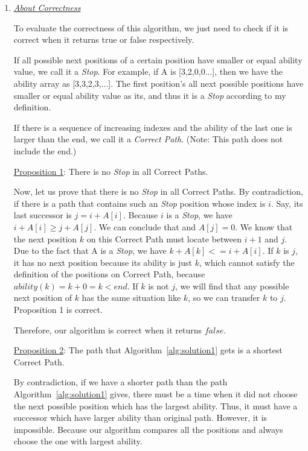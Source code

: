\documentclass[12pt,a4paper]{article}
\makeatletter
\newtheorem*{solution}{Solution}
\renewenvironment{solution}[1][Solution] {\par\pushQED{\qed}\normalfont\topsep6\p@\@plus6\p@\relax\trivlist\item[\hskip\labelsep\bfseries#1\@addpunct{.}]\ignorespaces}{\popQED\endtrivlist\@endpefalse} \makeatother
\makeatother
\begin{document}
\begin{enumerate}
\begin{solution}
\emph{\underline{About Correctness}}

To evaluate the correctness of this algorithm, we just need to check if it is correct when it returns true or false respectively.

\setlength\parindent{2em}



If all possible next positions of a certain  position have smaller or equal ability value, we call it a \emph{Stop}. For example, if A is [3,2,0,0...], then we have the ability array as [3,3,2,3,...]. The first position's all next possible positions have smaller or equal ability value as its, and thus it is a \emph{Stop} according to my definition.

If there is a sequence of increasing indexes and the ability of the last one is larger than the end, we call it a \emph{Correct Path}. (Note: This path does not include the end.)

\underline{Proposition 1}: There is no \emph{Stop} in all Correct Paths.

Now, let us prove that there is no \emph{Stop} in all Correct Paths. By contradiction, if there is a path that contains such an \emph{Stop} position whose index is $i$. Say, its last successor is $j=i+A[i]$. 
Because $i$ is a \emph{Stop}, we have $ i+A[i] \ge j+A[j] $.
We can conclude that and $A[j]=0$. We know that the next position $k$ on this Correct Path must locate between $i+1$ and $j$. Due to the fact that A is a \emph{Stop}, we have $k+A[k]<=i+A[i]$. If $k$ is $j$, it has no next position because its ability is just $k$, which cannot satisfy the definition of the positions on Correct Path, because $ ability(k) = k + 0 = k < end $. If $k$ is not $j$, we will find that any possible next position of $k$ has the same situation like $k$, so we can transfer $k$ to $j$.
Proposition 1 is correct.

Therefore, our algorithm is correct when it returns $false$. 

 


\underline{Proposition 2}: The path that Algorithm~\ref{alg:solution1} gets is a shortest Correct Path.


By contradiction, if we have a shorter path than the path Algorithm~\ref{alg:solution1} gives, there must be a time when it did not choose the next possible position which has the largest ability. Thus, it must have a successor which have larger ability than original path. However, it is impossible. Because our algorithm compares all the positions and always choose the one with largest ability.



\end{solution}
\end{enumerate}
\end{document}
